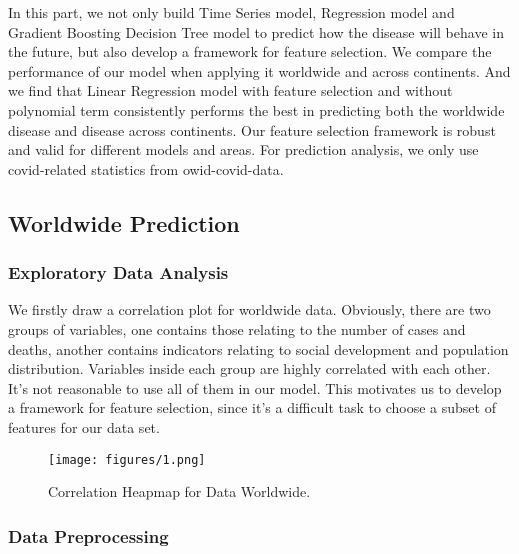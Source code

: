 \documentclass{article}
\begin{document}
In this part, we not only build Time Series model, Regression model and Gradient Boosting Decision Tree model to predict how the disease will behave in the future, but also develop a framework for feature selection. We compare the performance of our model when applying it worldwide and across continents. And we find that Linear Regression model with feature selection and without polynomial term consistently performs the best in predicting both the worldwide disease and disease across continents. Our feature selection framework is robust and valid for different models and areas. For prediction analysis, we only use covid-related statistics from owid-covid-data.\\

\subsection{Worldwide Prediction}

\subsubsection{Exploratory Data Analysis}

We firstly draw a correlation plot for worldwide data. Obviously, there are two groups of variables, one contains those relating to the number of cases and deaths, another contains indicators relating to social development and population distribution. Variables inside each group are highly correlated with each other. It's not reasonable to use all of them in our model. This motivates us to develop a framework for feature selection, since it's a difficult task to choose a subset of features for our data set. 

\begin{figure}[H]
    \centering
    \texttt{[image: figures/1.png]}%
    \caption{Correlation Heapmap for Data Worldwide.}
    \label{fig:heatmap}
\end{figure}

\subsubsection{Data Preprocessing}
\end{document}
